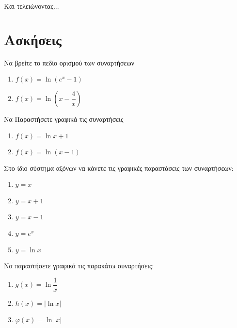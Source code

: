 \documentclass{presentation}
\begin{document}
\begin{frame}{Και τελειώνοντας...}

\end{frame}

\section{Ασκήσεις}
\begin{askisi}
  Να βρείτε το πεδίο ορισμού των συναρτήσεων
  \begin{enumerate}
    \item<1-> $f(x)=\ln (e^x-1)$
    \item<2-> $f(x)=\ln \left( x-\dfrac{4}{x} \right) $
  \end{enumerate}


\end{askisi}

\begin{askisi}
  Να Παραστήσετε γραφικά τις συναρτήσεις
  \begin{enumerate}
    \item<1-> $f(x)=\ln x+1$
    \item<2-> $f(x)=\ln (x-1)$
  \end{enumerate}


\end{askisi}

\begin{askisi}
  Στο ίδιο σύστημα αξόνων να κάνετε τις γραφικές παραστάσεις των συναρτήσεων:
  \begin{enumerate}
    \item $y=x$
    \item $y=x+1$
    \item $y=x-1$
    \item $y=e^x$
    \item $y=\ln x$
  \end{enumerate}


\end{askisi}

\begin{askisi}
  Να παραστήσετε γραφικά τις παρακάτω συναρτήσεις:
  \begin{enumerate}
    \item<1-> $g(x)=\ln \dfrac{1}{x}$
    \item<2-> $h(x)=|\ln x|$
    \item<3-> $φ(x)=\ln |x|$
  \end{enumerate}


\end{askisi}
\end{document}

